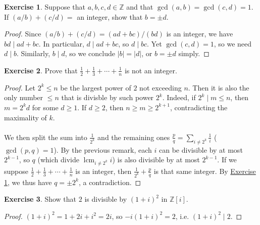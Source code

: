 \documentclass{article}
\theoremstyle{definition}
\newtheorem{exercise}{Exercise}
\begin{document}
\newpage

\begin{exercise} \label{c1-ex-29}
Suppose that $a, b, c, d \in \mathbb{Z}$ and that $\gcd(a, b) = \gcd(c, d) = 1$. If $(a/b) + (c/d) = $ an integer, show that $b = \pm d$.
\end{exercise}
\begin{proof}
Since $(a/b) + (c/d) = (ad + bc)/(bd)$ is an integer, we have $bd \mid ad + bc$. In particular, $d \mid ad + bc$, so $d \mid bc$. Yet $\gcd(c, d) = 1$, so we need $d \mid b$. Similarly, $b \mid d$, so we conclude $|b| = |d|$, or $b = \pm d$ simply.
\end{proof}

\newpage

\begin{exercise}
Prove that $\frac{1}{2} + \frac{1}{3} + \cdots + \frac{1}{n}$ is not an integer.
\end{exercise}
\begin{proof}
Let $2^k \leq n$ be the largest power of $2$ not exceeding $n$. Then it is also the only number $\leq n$ that is divisble by such power $2^k$. Indeed, if $2^k \mid m \leq n$, then $m = 2^k d$ for some $d \geq 1$. If $d \geq 2$, then $n \geq m \geq 2^{k + 1}$, contradicting the maximality of $k$.
\\
\\
We then split the sum into $\frac{1}{2^k}$ and the remaining ones $\frac{p}{q} = \sum_{i \neq 2^k} \frac{1}{i}$ ($\gcd(p, q) = 1$). By the previous remark, each $i$ can be divisible by at most $2^{k - 1}$, so $q$ (which divide $\operatorname{lcm}_{i \neq 2^k} i$) is also divisible by at most $2^{k - 1}$. If we suppose $\frac{1}{2} + \frac{1}{3} + \cdots + \frac{1}{n}$ is an integer, then $\frac{1}{2^k} + \frac{p}{q}$ is that same integer. By \hyperref[c1-ex-29]{Exercise \ref*{c1-ex-29}}, we thus have $q = \pm 2^k$, a contradiction.
\end{proof}

\newpage

\begin{exercise}
Show that $2$ is divisible by $(1 + i)^2$ in $\mathbb{Z}[i]$.
\end{exercise}
\begin{proof}
$(1 + i)^2 = 1 + 2i + i^2 = 2i$, so $-i (1 + i)^2 = 2$, i.e. $(1 + i)^2 \mid 2$.
\end{proof}

\newpage
\end{document}
